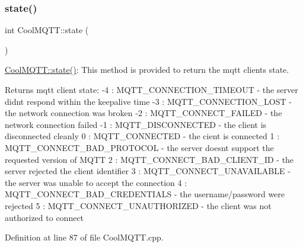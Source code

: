 \subsubsection{\texorpdfstring{state()}{state()}}
{\footnotesize\ttfamily int Cool\+M\+Q\+T\+T\+::state (\begin{DoxyParamCaption}{ }\end{DoxyParamCaption})}

\hyperlink{class_cool_m_q_t_t_a5d003307eff78efbd585e42b43b72b6d}{Cool\+M\+Q\+T\+T\+::state()}\+: This method is provided to return the mqtt client\textquotesingle{}s state. \begin{DoxyReturn}{Returns}
mqtt client state\+: -\/4 \+: M\+Q\+T\+T\+\_\+\+C\+O\+N\+N\+E\+C\+T\+I\+O\+N\+\_\+\+T\+I\+M\+E\+O\+UT -\/ the server didn\textquotesingle{}t respond within the keepalive time -\/3 \+: M\+Q\+T\+T\+\_\+\+C\+O\+N\+N\+E\+C\+T\+I\+O\+N\+\_\+\+L\+O\+ST -\/ the network connection was broken -\/2 \+: M\+Q\+T\+T\+\_\+\+C\+O\+N\+N\+E\+C\+T\+\_\+\+F\+A\+I\+L\+ED -\/ the network connection failed -\/1 \+: M\+Q\+T\+T\+\_\+\+D\+I\+S\+C\+O\+N\+N\+E\+C\+T\+ED -\/ the client is disconnected cleanly 0 \+: M\+Q\+T\+T\+\_\+\+C\+O\+N\+N\+E\+C\+T\+ED -\/ the cient is connected 1 \+: M\+Q\+T\+T\+\_\+\+C\+O\+N\+N\+E\+C\+T\+\_\+\+B\+A\+D\+\_\+\+P\+R\+O\+T\+O\+C\+OL -\/ the server doesn\textquotesingle{}t support the requested version of M\+Q\+TT 2 \+: M\+Q\+T\+T\+\_\+\+C\+O\+N\+N\+E\+C\+T\+\_\+\+B\+A\+D\+\_\+\+C\+L\+I\+E\+N\+T\+\_\+\+ID -\/ the server rejected the client identifier 3 \+: M\+Q\+T\+T\+\_\+\+C\+O\+N\+N\+E\+C\+T\+\_\+\+U\+N\+A\+V\+A\+I\+L\+A\+B\+LE -\/ the server was unable to accept the connection 4 \+: M\+Q\+T\+T\+\_\+\+C\+O\+N\+N\+E\+C\+T\+\_\+\+B\+A\+D\+\_\+\+C\+R\+E\+D\+E\+N\+T\+I\+A\+LS -\/ the username/password were rejected 5 \+: M\+Q\+T\+T\+\_\+\+C\+O\+N\+N\+E\+C\+T\+\_\+\+U\+N\+A\+U\+T\+H\+O\+R\+I\+Z\+ED -\/ the client was not authorized to connect 
\end{DoxyReturn}


Definition at line 87 of file Cool\+M\+Q\+T\+T.\+cpp.


